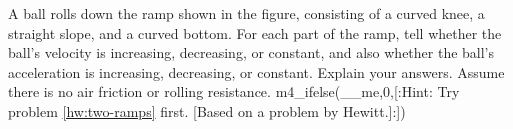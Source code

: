A ball rolls down the ramp shown in the figure,
consisting of a curved knee, a straight slope, and a curved
bottom. For each part of the ramp, tell whether the ball's
velocity is increasing, decreasing, or constant, and also
whether the ball's acceleration is increasing, decreasing,
or constant. Explain your answers. Assume there is no air
friction or rolling resistance. m4_ifelse(__me,0,[:Hint: Try problem \ref{hw:two-ramps} first.
[Based on a problem by Hewitt.]:])
